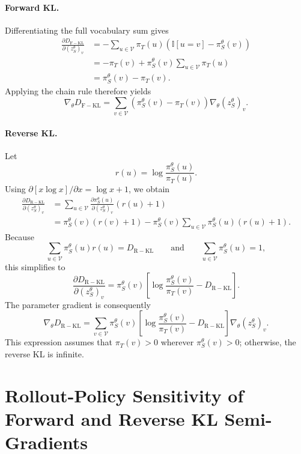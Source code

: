 \documentclass{article} %
\theoremstyle{plain}
\theoremstyle{definition}
\theoremstyle{remark}
\begin{document}
\paragraph{Forward KL.}
Differentiating the full vocabulary sum gives
\begin{align}
\frac{\partial D_{\mathrm{F-KL}}}
{\partial (z_S^\theta)_v}
&=
-\sum_{u\in\mathcal{V}}
\pi_T(u)
\left(
\mathbb{I}[u=v]-\pi_S^\theta(v)
\right)
\\
&=
-\pi_T(v)
+
\pi_S^\theta(v)
\sum_{u\in\mathcal{V}}\pi_T(u)
\\
&=
\pi_S^\theta(v)-\pi_T(v).
\end{align}
Applying the chain rule therefore yields
\[
\nabla_\theta D_{\mathrm{F-KL}}
=
\sum_{v\in\mathcal{V}}
\left(
\pi_S^\theta(v)-\pi_T(v)
\right)
\nabla_\theta(z_S^\theta)_v.
\]

\paragraph{Reverse KL.}
Let
\[
r(u)=\log\frac{\pi_S^\theta(u)}{\pi_T(u)}.
\]
Using \(\partial[x\log x]/\partial x=\log x+1\), we obtain
\begin{align}
\frac{\partial D_{\mathrm{R-KL}}}
{\partial (z_S^\theta)_v}
&=
\sum_{u\in\mathcal{V}}
\frac{\partial\pi_S^\theta(u)}
{\partial(z_S^\theta)_v}
\left(r(u)+1\right)
\\
&=
\pi_S^\theta(v)\left(r(v)+1\right)
-
\pi_S^\theta(v)
\sum_{u\in\mathcal{V}}
\pi_S^\theta(u)\left(r(u)+1\right).
\end{align}
Because
\[
\sum_{u\in\mathcal{V}}\pi_S^\theta(u)r(u)
=
D_{\mathrm{R-KL}}
\qquad\text{and}\qquad
\sum_{u\in\mathcal{V}}\pi_S^\theta(u)=1,
\]
this simplifies to
\[
\frac{\partial D_{\mathrm{R-KL}}}
{\partial(z_S^\theta)_v}
=
\pi_S^\theta(v)
\left[
\log\frac{\pi_S^\theta(v)}{\pi_T(v)}
-
D_{\mathrm{R-KL}}
\right].
\]
The parameter gradient is consequently
\[
\nabla_\theta D_{\mathrm{R-KL}}
=
\sum_{v\in\mathcal{V}}
\pi_S^\theta(v)
\left[
\log\frac{\pi_S^\theta(v)}{\pi_T(v)}
-
D_{\mathrm{R-KL}}
\right]
\nabla_\theta(z_S^\theta)_v.
\]
This expression assumes that \(\pi_T(v)>0\) wherever \(\pi_S^\theta(v)>0\); otherwise, the reverse KL is infinite.

\clearpage
\section{Rollout-Policy Sensitivity of Forward and Reverse KL Semi-Gradients}
\label{app:bullshit}
\end{document}
